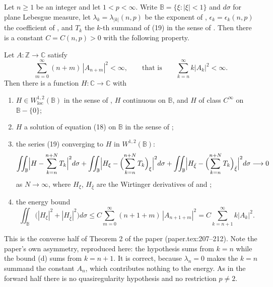 \begin{theorem}
Let $n\ge1$ be an integer and let $1<p<\infty$.  Write
$\mathbb{B}=\{\xi:|\xi|<1\}$ and $d\sigma$ for plane Lebesgue measure, let
$\lambda_k=\lambda_{|k|}(n,p)$ be the exponent of ,
$\epsilon_k=\epsilon_k(n,p)$ the coefficient of , and $T_k$
the $k$-th summand of (19) in the sense of .  Then there is a
constant $C=C(n,p)>0$ with the following property.

Let $A\colon\mathbb{Z}\to\mathbb{C}$ satisfy
\[
  \sum_{m=0}^{\infty}(n+m)\,|A_{n+m}|^2<\infty,
  \qquad\text{that is}\qquad \sum_{k=n}^{\infty}k|A_k|^2<\infty .
\]
Then there is a function $H\colon\mathbb{C}\to\mathbb{C}$ with
\begin{enumerate}
\item[(a)] $H\in W^{1,2}_{\mathrm{loc}}(\mathbb{B})$ in the sense of
  , $H$ continuous on $\mathbb{B}$, and $H$ of class
  $C^\infty$ on $\mathbb{B}-\{0\}$;
\item[(b)] $H$ a solution of equation (18) on $\mathbb{B}$ in the sense of
  ;
\item[(c)] the series (19) converging to $H$ in $W^{1,2}(\mathbb{B})$:
\[
  \iint_{\mathbb{B}}\Bigl|H-\sum_{k=n}^{n+N}T_k\Bigr|^2d\sigma
  +\iint_{\mathbb{B}}\Bigl|H_\xi-\Bigl(\sum_{k=n}^{n+N}T_k\Bigr)_\xi\Bigr|^2d\sigma
  +\iint_{\mathbb{B}}\Bigl|H_{\bar\xi}
      -\Bigl(\sum_{k=n}^{n+N}T_k\Bigr)_{\bar\xi}\Bigr|^2d\sigma
  \longrightarrow0
\]
as $N\to\infty$, where $H_\xi$, $H_{\bar\xi}$ are the Wirtinger derivatives of
 and ;
\item[(d)] the energy bound
\[
  \iint_{\mathbb{B}}\bigl(|H_\xi|^2+|H_{\bar\xi}|^2\bigr)d\sigma
  \le C\sum_{m=0}^{\infty}(n+1+m)\,|A_{n+1+m}|^2
  =C\sum_{k=n+1}^{\infty}k|A_k|^2 .
\]
\end{enumerate}

This is the converse half of Theorem 2 of the paper (paper.tex:207--212).  Note
the paper's own asymmetry, reproduced here: the hypothesis sums from $k=n$ while
the bound (d) sums from $k=n+1$.  It is correct, because $\lambda_n=0$ makes the
$k=n$ summand the constant $A_n$, which contributes nothing to the energy.
As in the forward half there is no quasiregularity hypothesis and no
restriction $p\neq2$.
\end{theorem}
